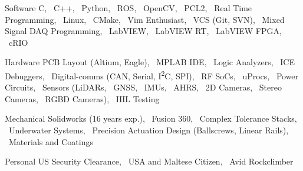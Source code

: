 
\begin{cvskills}

  \cvskill%
      {Software}
      {
            C,  
            \ C++,  
            \ Python,  
            \ ROS,  
            \ OpenCV,  
            \ PCL2,
            \ Real Time Programming,  
            \ Linux,  
            \ CMake,  
            \ Vim Enthusiast,
            \ VCS (Git, SVN),  
            \ Mixed Signal DAQ Programming,  
            \ LabVIEW,  
            \ LabVIEW RT,  
            \ LabVIEW FPGA,  
            \ cRIO
        }

  \cvskill%
      {Hardware} 
      {
            PCB Layout (Altium, Eagle),
            \ MPLAB IDE, 
            \ Logic Analyzers, 
            \ ICE Debuggers, 
            \ Digital-comms (CAN, Serial, I\textsuperscript{2}C, SPI),
            \ RF SoCs, 
            \ uProcs, 
            \ Power Circuits, 
            \ Sensors (LiDARs, 
            \ GNSS, 
            \ IMUs, 
            \ AHRS, 
            \ 2D Cameras, 
            \ Stereo Cameras,  
            \ RGBD Cameras),
            \ HIL Testing
      }

  \cvskill%
      {Mechanical}
      {
            Solidworks (16 years exp.),
            \ Fusion 360,
            \ Complex Tolerance Stacks,
            \ Underwater Systems,
            \ Precision Actuation Design (Ballscrews, Linear Rails), 
            \ Materials and Coatings
      }

  \cvskill%
      {Personal}
      {
            US Security Clearance, 
            \ USA and Maltese Citizen, 
            \ Avid Rockclimber
      }

\end{cvskills}
